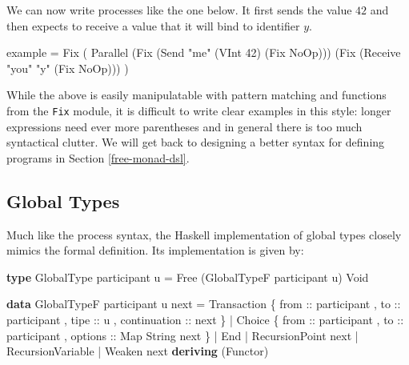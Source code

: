 \documentclass[runningheads,plain]{llncs}
\newenvironment{Shaded}{}{}
\newcommand{\KeywordTok}[1]{\textcolor[rgb]{0.00,0.44,0.13}{\textbf{#1}}}
\newcommand{\DataTypeTok}[1]{\textcolor[rgb]{0.56,0.13,0.00}{#1}}
\newcommand{\DecValTok}[1]{\textcolor[rgb]{0.25,0.63,0.44}{#1}}
\newcommand{\StringTok}[1]{\textcolor[rgb]{0.25,0.44,0.63}{#1}}
\newcommand{\OtherTok}[1]{\textcolor[rgb]{0.00,0.44,0.13}{#1}}
\newcommand{\FunctionTok}[1]{\textcolor[rgb]{0.02,0.16,0.49}{#1}}
\newcommand{\NormalTok}[1]{#1}
\begin{document}
We can now write processes like the one below. It first sends the value $42$ and then expects to receive a value that it will bind to identifier $y$.

\begin{Shaded}
\begin{Highlighting}[]
\NormalTok{example }\FunctionTok{=} 
    \DataTypeTok{Fix} 
\NormalTok{        ( }\DataTypeTok{Parallel} 
\NormalTok{            (}\DataTypeTok{Fix}\NormalTok{ (}\DataTypeTok{Send} \StringTok{"me"}\NormalTok{ (}\DataTypeTok{VInt} \DecValTok{42}\NormalTok{) (}\DataTypeTok{Fix} \DataTypeTok{NoOp}\NormalTok{)))}
\NormalTok{            (}\DataTypeTok{Fix}\NormalTok{ (}\DataTypeTok{Receive} \StringTok{"you"} \StringTok{"y"}\NormalTok{ (}\DataTypeTok{Fix} \DataTypeTok{NoOp}\NormalTok{)))}
\NormalTok{        )}
\end{Highlighting}
\end{Shaded}

While the above is easily manipulatable with pattern matching and
functions from the \texttt{Fix} module, it is difficult to write clear
examples in this style: longer expressions need ever more parentheses
and in general there is too much syntactical clutter. We will get back
to designing a better syntax for defining programs in Section
\ref{free-monad-dsl}.

\subsection{Global Types}

Much like the process syntax, the Haskell implementation of global types closely mimics the formal definition.
Its implementation is given by: 

\begin{Shaded}
\begin{Highlighting}[]
\KeywordTok{type} \DataTypeTok{GlobalType}\NormalTok{ participant u }\FunctionTok{=} 
    \DataTypeTok{Free}\NormalTok{ (}\DataTypeTok{GlobalTypeF}\NormalTok{ participant u) }\DataTypeTok{Void}

\KeywordTok{data} \DataTypeTok{GlobalTypeF}\NormalTok{ participant u next}
    \FunctionTok{=} \DataTypeTok{Transaction} 
\NormalTok{        \{}\OtherTok{ from ::}\NormalTok{ participant}
\NormalTok{        ,}\OtherTok{ to ::}\NormalTok{ participant}
\NormalTok{        ,}\OtherTok{ tipe ::}\NormalTok{ u}
\NormalTok{        ,}\OtherTok{ continuation ::}\NormalTok{  next }
\NormalTok{        \} }
    \FunctionTok{|} \DataTypeTok{Choice} 
\NormalTok{        \{}\OtherTok{ from ::}\NormalTok{ participant}
\NormalTok{        ,}\OtherTok{ to ::}\NormalTok{ participant}
\NormalTok{        ,}\OtherTok{ options ::} \DataTypeTok{Map} \DataTypeTok{String}\NormalTok{ next }
\NormalTok{        \}}
    \FunctionTok{|} \DataTypeTok{End}
    \FunctionTok{|} \DataTypeTok{RecursionPoint}\NormalTok{ next}
    \FunctionTok{|} \DataTypeTok{RecursionVariable}
    \FunctionTok{|} \DataTypeTok{Weaken}\NormalTok{ next}
    \KeywordTok{deriving}\NormalTok{ (}\DataTypeTok{Functor}\NormalTok{)}
\end{Highlighting}
\end{Shaded}
\end{document}
